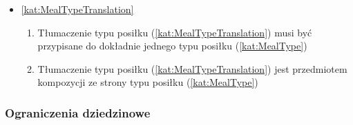 \begin{itemize}[label={\textbf{Reguły dla}}, wide, labelwidth=!, labelindent=0pt]
\begin{enumerate}[label={\textbf{REG/3/\protect\twodigits{\arabic{enumi}}}}, wide, labelwidth=!, align=left, leftmargin=3cm, resume]
    \end{enumerate}
    \item\ref{kat:MealTypeTranslation}\mynobreakpar
    \begin{enumerate}[label={\textbf{REG/3/\protect\twodigits{\arabic{enumi}}}}, wide, labelwidth=!, align=left, leftmargin=3cm, resume]
        \item Tłumaczenie typu posiłku (\ref{kat:MealTypeTranslation}) musi być przypisane do dokładnie jednego typu posiłku (\ref{kat:MealType})
        \item Tłumaczenie typu posiłku (\ref{kat:MealTypeTranslation}) jest przedmiotem kompozycji ze strony typu posiłku (\ref{kat:MealType})
    \end{enumerate}
\end{itemize}

\subsubsection{Ograniczenia dziedzinowe}\label{subsubsec:database:recipes:restrictions}

